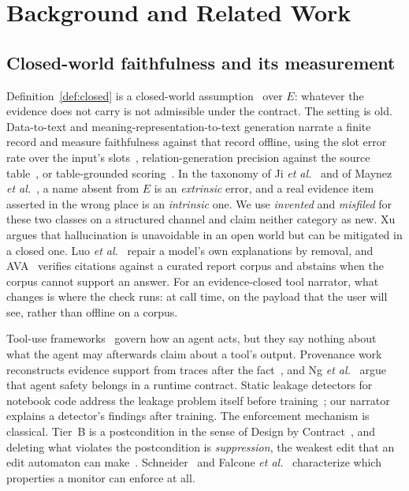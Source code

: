 \documentclass[journal]{IEEEtran}
\begin{document}
\section{Background and Related Work}\label{sec:related}

\subsection{Closed-world faithfulness and its measurement}

Definition~\ref{def:closed} is a closed-world assumption~\cite{reiter1978closed}
over $E$: whatever the evidence does not carry is not admissible under the
contract. The setting is old. Data-to-text and
meaning-representation-to-text generation narrate a finite record and measure
faithfulness against that record offline, using the slot error rate over the
input's slots~\cite{dusek2020e2e}, relation-generation precision against the
source table~\cite{wiseman2017challenges}, or table-grounded
scoring~\cite{dhingra2019parent}. In the taxonomy of Ji \emph{et
al.}~\cite{ji} and of Maynez \emph{et al.}~\cite{maynez2020faithfulness}, a
name absent from $E$ is an \emph{extrinsic} error, and a real evidence item
asserted in the wrong place is an \emph{intrinsic} one. We use
\emph{invented} and \emph{misfiled} for these two classes on a structured
channel and claim neither category as new. Xu~\cite{xu2025openworld} argues
that hallucination is unavoidable in an open world but can be mitigated in a
closed one. Luo \emph{et al.}~\cite{luo2026removal} repair a model's own
explanations by removal, and AVA~\cite{karnatak2026ava} verifies citations
against a curated report corpus and abstains when the corpus cannot support an
answer. For an evidence-closed tool narrator, what changes is where the check
runs: at call time, on the payload that the user will see, rather than offline
on a corpus.

Tool-use frameworks~\cite{react,toolformer,mcp} govern how an agent acts, but
they say nothing about what the agent may afterwards claim about a tool's
output. Provenance work reconstructs evidence support from traces after the
fact~\cite{wang2026agenttraces}, and Ng \emph{et
al.}~\cite{ng2026runtimecontract} argue that agent safety belongs in a runtime
contract. Static leakage detectors for notebook code address the leakage
problem itself before training~\cite{yang2022leakage,truong2025leakagedetector};
our narrator explains a detector's findings after training. The enforcement
mechanism is classical. Tier~B is a postcondition in the sense of Design by
Contract~\cite{meyer1992dbc}, and deleting what violates the postcondition is
\emph{suppression}, the weakest edit that an edit automaton can
make~\cite{ligatti2005edit}. Schneider~\cite{schneider2000enforceable} and
Falcone \emph{et al.}~\cite{falcone2012verify} characterize which properties a
monitor can enforce at all.
\end{document}
